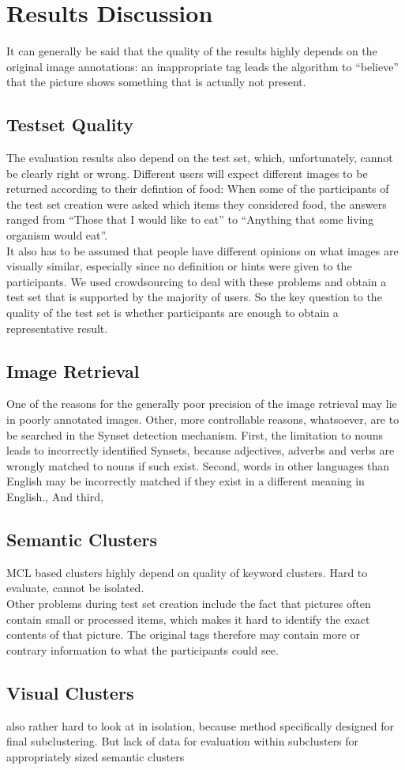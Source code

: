 %
\section{Results Discussion}
\label{sec_discussion}

It can generally be said that the quality of the results highly depends on the original image annotations: an inappropriate tag leads the algorithm to ``believe'' that the picture shows something that is actually not present.

\subsection{Testset Quality}
The evaluation results also depend on the test set, which, unfortunately, cannot be clearly right or wrong. Different users will expect different images to be returned according to their defintion of food: When some of the participants of the test set creation were asked which items they considered food, the answers ranged from ``Those that I would like to eat'' to ``Anything that some living organism would eat''. \\
It also has to be assumed that people have different opinions on what images are visually similar, especially since no definition or hints were given to the participants. We used crowdsourcing to deal with these problems and obtain a test set that is supported by the majority of users. So the key question to the quality of the test set is whether  participants are enough to obtain a representative result.

\subsection{Image Retrieval}
One of the reasons for the generally poor precision of the image retrieval may lie in poorly annotated images.
Other, more controllable reasons, whatsoever, are to be searched in the Synset detection mechanism. First, the limitation to nouns leads to incorrectly identified Synsets, because adjectives, adverbs and verbs are wrongly matched to nouns if such exist. 
Second, words in other languages than English may be incorrectly matched if they exist in a different meaning in English.,
And third, 


\subsection{Semantic Clusters}
MCL based clusters highly depend on quality of keyword clusters. Hard to evaluate, cannot be isolated.\\
Other problems during test set creation include the fact that pictures often contain small or processed items, which makes it hard to identify the exact contents of that picture. The original tags therefore may contain more or contrary information to what the participants could see. 

\subsection{Visual Clusters}
also rather hard to look at in isolation, because method specifically designed for final subclustering. But lack of data for evaluation within subclusters for appropriately sized semantic clusters